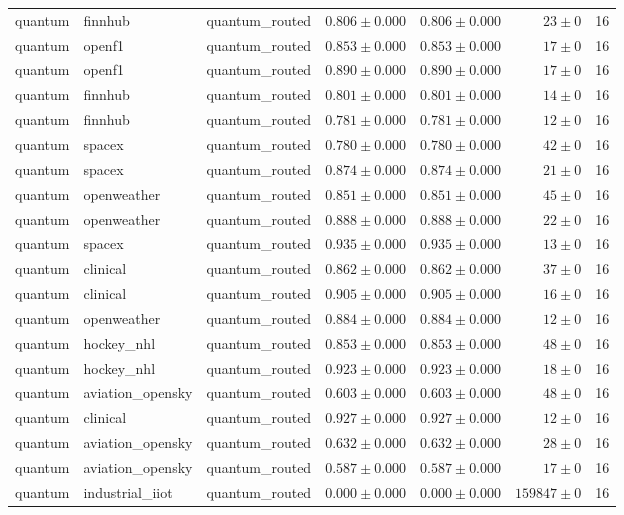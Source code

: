 \begin{table}[htbp]
\begin{tabular}{l l l r r r r}
quantum & finnhub & quantum\_routed & $0.806\pm0.000$ & $0.806\pm0.000$ & $23\pm0$ & 16 \\
quantum & openf1 & quantum\_routed & $0.853\pm0.000$ & $0.853\pm0.000$ & $17\pm0$ & 16 \\
quantum & openf1 & quantum\_routed & $0.890\pm0.000$ & $0.890\pm0.000$ & $17\pm0$ & 16 \\
quantum & finnhub & quantum\_routed & $0.801\pm0.000$ & $0.801\pm0.000$ & $14\pm0$ & 16 \\
quantum & finnhub & quantum\_routed & $0.781\pm0.000$ & $0.781\pm0.000$ & $12\pm0$ & 16 \\
quantum & spacex & quantum\_routed & $0.780\pm0.000$ & $0.780\pm0.000$ & $42\pm0$ & 16 \\
quantum & spacex & quantum\_routed & $0.874\pm0.000$ & $0.874\pm0.000$ & $21\pm0$ & 16 \\
quantum & openweather & quantum\_routed & $0.851\pm0.000$ & $0.851\pm0.000$ & $45\pm0$ & 16 \\
quantum & openweather & quantum\_routed & $0.888\pm0.000$ & $0.888\pm0.000$ & $22\pm0$ & 16 \\
quantum & spacex & quantum\_routed & $0.935\pm0.000$ & $0.935\pm0.000$ & $13\pm0$ & 16 \\
quantum & clinical & quantum\_routed & $0.862\pm0.000$ & $0.862\pm0.000$ & $37\pm0$ & 16 \\
quantum & clinical & quantum\_routed & $0.905\pm0.000$ & $0.905\pm0.000$ & $16\pm0$ & 16 \\
quantum & openweather & quantum\_routed & $0.884\pm0.000$ & $0.884\pm0.000$ & $12\pm0$ & 16 \\
quantum & hockey\_nhl & quantum\_routed & $0.853\pm0.000$ & $0.853\pm0.000$ & $48\pm0$ & 16 \\
quantum & hockey\_nhl & quantum\_routed & $0.923\pm0.000$ & $0.923\pm0.000$ & $18\pm0$ & 16 \\
quantum & aviation\_opensky & quantum\_routed & $0.603\pm0.000$ & $0.603\pm0.000$ & $48\pm0$ & 16 \\
quantum & clinical & quantum\_routed & $0.927\pm0.000$ & $0.927\pm0.000$ & $12\pm0$ & 16 \\
quantum & aviation\_opensky & quantum\_routed & $0.632\pm0.000$ & $0.632\pm0.000$ & $28\pm0$ & 16 \\
quantum & aviation\_opensky & quantum\_routed & $0.587\pm0.000$ & $0.587\pm0.000$ & $17\pm0$ & 16 \\
quantum & industrial\_iiot & quantum\_routed & $0.000\pm0.000$ & $0.000\pm0.000$ & $159847\pm0$ & 16 \\

\end{tabular}
\end{table}
